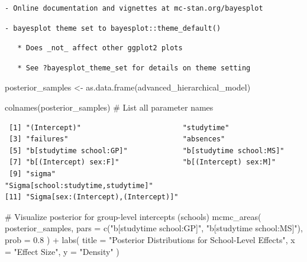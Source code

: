 \documentclass[
  10pt,
]{article}
\newenvironment{Shaded}{\begin{snugshade}}{\end{snugshade}}
\newcommand{\AttributeTok}[1]{\textcolor[rgb]{0.40,0.45,0.13}{#1}}
\newcommand{\CommentTok}[1]{\textcolor[rgb]{0.37,0.37,0.37}{#1}}
\newcommand{\FloatTok}[1]{\textcolor[rgb]{0.68,0.00,0.00}{#1}}
\newcommand{\FunctionTok}[1]{\textcolor[rgb]{0.28,0.35,0.67}{#1}}
\newcommand{\NormalTok}[1]{\textcolor[rgb]{0.00,0.23,0.31}{#1}}
\newcommand{\OtherTok}[1]{\textcolor[rgb]{0.00,0.23,0.31}{#1}}
\newcommand{\SpecialCharTok}[1]{\textcolor[rgb]{0.37,0.37,0.37}{#1}}
\newcommand{\StringTok}[1]{\textcolor[rgb]{0.13,0.47,0.30}{#1}}
\begin{document}
\begin{verbatim}
- Online documentation and vignettes at mc-stan.org/bayesplot
\end{verbatim}

\begin{verbatim}
- bayesplot theme set to bayesplot::theme_default()
\end{verbatim}

\begin{verbatim}
   * Does _not_ affect other ggplot2 plots
\end{verbatim}

\begin{verbatim}
   * See ?bayesplot_theme_set for details on theme setting
\end{verbatim}

\begin{Shaded}
\begin{Highlighting}[]
\NormalTok{posterior\_samples }\OtherTok{\textless{}{-}} \FunctionTok{as.data.frame}\NormalTok{(advanced\_hierarchical\_model)}

\FunctionTok{colnames}\NormalTok{(posterior\_samples) }\CommentTok{\# List all parameter names}
\end{Highlighting}
\end{Shaded}

\begin{verbatim}
 [1] "(Intercept)"                        "studytime"                         
 [3] "failures"                           "absences"                          
 [5] "b[studytime school:GP]"             "b[studytime school:MS]"            
 [7] "b[(Intercept) sex:F]"               "b[(Intercept) sex:M]"              
 [9] "sigma"                              "Sigma[school:studytime,studytime]" 
[11] "Sigma[sex:(Intercept),(Intercept)]"
\end{verbatim}

\begin{Shaded}
\begin{Highlighting}[]
\CommentTok{\# Visualize posterior for group{-}level intercepts (schools)}
\FunctionTok{mcmc\_areas}\NormalTok{(}
\NormalTok{  posterior\_samples,}
  \AttributeTok{pars =} \FunctionTok{c}\NormalTok{(}\StringTok{"b[studytime school:GP]"}\NormalTok{, }\StringTok{"b[studytime school:MS]"}\NormalTok{),}
  \AttributeTok{prob =} \FloatTok{0.8}
\NormalTok{) }\SpecialCharTok{+}
  \FunctionTok{labs}\NormalTok{(}
    \AttributeTok{title =} \StringTok{"Posterior Distributions for School{-}Level Effects"}\NormalTok{,}
    \AttributeTok{x =} \StringTok{"Effect Size"}\NormalTok{,}
    \AttributeTok{y =} \StringTok{"Density"}
\NormalTok{  )}
\end{Highlighting}
\end{Shaded}
\end{document}
